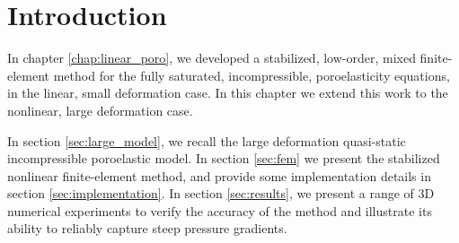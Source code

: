 \section{Introduction}
In chapter \ref{chap:linear_poro}, we developed a stabilized, low-order, mixed finite-element method for the fully saturated, incompressible, poroelasticity equations, in the linear, small deformation case. In this chapter we extend this work to the nonlinear, large deformation case.

In section \ref{sec:large_model}, we recall the large deformation quasi-static incompressible poroelastic model. In section \ref{sec:fem} we present the stabilized nonlinear finite-element method, and provide some implementation details in section \ref{sec:implementation}. In section \ref{sec:results}, we present a range of 3D  numerical experiments to verify the accuracy of the method and illustrate its ability to reliably capture steep pressure gradients.